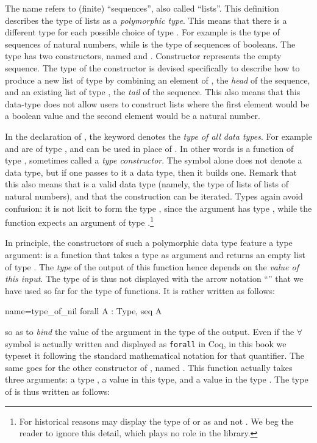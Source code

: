 The name  refers to (finite) ``sequences'', also called
``lists''. This definition describes the type
of lists as a {\em polymorphic type}. This means that there is a
different type  for each possible choice of type .  For example
 is the type of sequences of natural numbers, while
 is the type of sequences of booleans.
The type  has two
constructors, named  and . Constructor 
represents the empty sequence. The type of the
constructor  is devised specifically to describe how to produce a
new list of type  by combining an element of , the
\emph{head} of the sequence, and an
existing list of type , the \emph{tail} of the sequence.  This
also means that this data-type
does not allow users to construct lists where the first element would be
a boolean value and the second element would be a natural number.

In the declaration of , the keyword  denotes the
\emph{type of all data types}.  For example  and  are of type
, and can be used in place of .
In other words  is a function of type , sometimes
called a \emph{type constructor}.  The symbol  alone does not
denote a data type,
but if one passes to it a data type, then it builds one.  Remark
that this also means that  is a valid data type
(namely, the type of lists of lists of natural numbers), and
that the construction can be iterated.
Types again avoid confusion: it is not licit to form the type ,
since the argument  has type , while the function
 expects an argument of type .\footnote{For historical
reasons \Coq{} may display the type of  or  as 
and not .  We beg the reader to ignore this detail, which
plays no role in the \mcbMC{} library.}

In principle, the constructors of such a polymorphic data type feature
a type argument:
 is a function that takes a type  as argument and returns
an empty list of type . The \emph{type} of the output of
this function hence depends on the \emph{value of this input}. The
type of  is thus not displayed with the arrow notation
``'' that we have used so far for the type of
functions. It is rather written as follows:

\begin{coq}{name=type_of_nil}{}
  forall A : Type, seq A
\end{coq}
so as to \emph{bind} the value  of the argument in the type of
the output. Even if the $\forall$ symbol is actually written and displayed as
\verb+forall+ in Coq, in this book we typeset it following the standard
mathematical notation for that quantifier.
The same goes for the other constructor of , named
.  This function actually takes three arguments: a type ,
a value in this type, and a value in the type .  The type
of  is thus written as follows:

